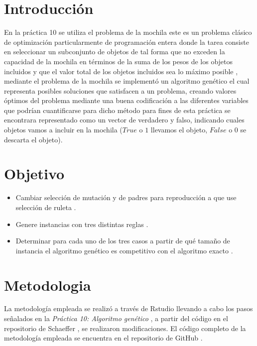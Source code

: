 \documentclass[10pt,a4paper]{article}
\begin{document}
	\begin{multicols}{2}
		\section{Introducción} \label{Intro}
		En la práctica 10 se utiliza el problema de la mochila este es un problema clásico de optimización particularmente de programación entera donde la tarea consiste en seleccionar un subconjunto de objetos de tal forma que no exceden la capacidad de la mochila en términos de la suma de los pesos de los objetos incluidos y que el valor total de los objetos incluidos sea lo máximo posible  \cite{p10}, mediante el problema de la mochila se implementó un algoritmo genético el cual representa posibles soluciones que satisfacen a un problema, creando valores óptimos del problema mediante una buena codificación a las diferentes variables que podrían cuantificarse para dicho método para fines de esta práctica se encontrara representado como un vector de verdadero y falso, indicando cuales objetos vamos a incluir en la mochila ($True$ o $1$ llevamos el objeto, $False$ o $0$ se descarta el objeto).

		\section{Objetivo} \label{antece}
		\begin{itemize}
		    \item Cambiar selección de mutación y de padres para reproducción a que use selección de ruleta \cite{p10}.

            \item Genere instancias con tres distintas reglas \cite{p10}.

\item Determinar para cada uno de los tres casos a partir de qué tamaño de instancia el algoritmo genético es competitivo con el algoritmo exacto  \cite{p10}.
	\end{itemize}
	\section{Metodologia}	
	La metodología empleada se realizó a través de Rstudio \cite{RStudio} llevando a cabo los pasos señalados en la \textit{Práctica 10: Algoritmo genético} \cite{p10}, a partir del código en el repositorio de Schaeffer \cite{GITSCHAEFFER}, se realizaron modificaciones. El código completo de la metodología empleada se encuentra en el repositorio de GitHub \cite{gitadrian}.

\end{multicols}
\end{document}
